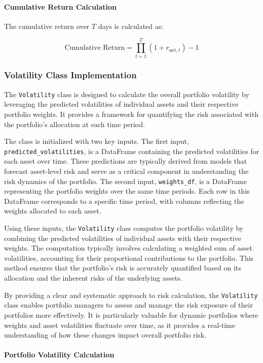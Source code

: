 \paragraph{Cumulative Return Calculation}

The cumulative return over \( T \) days is calculated as:

\[
\text{Cumulative Return} = \prod_{t=1}^T (1 + r_{\text{net}, t}) - 1
\]


\subsubsection{Volatility Class Implementation}

The \texttt{Volatility} class is designed to calculate the overall portfolio volatility by leveraging the predicted volatilities of individual assets and their respective portfolio weights. It provides a framework for quantifying the risk associated with the portfolio's allocation at each time period.

The class is initialized with two key inputs. The first input, \texttt{predicted\_volatilities}, is a DataFrame containing the predicted volatilities for each asset over time. These predictions are typically derived from models that forecast asset-level risk and serve as a critical component in understanding the risk dynamics of the portfolio. The second input, \texttt{weights\_df}, is a DataFrame representing the portfolio weights over the same time periods. Each row in this DataFrame corresponds to a specific time period, with columns reflecting the weights allocated to each asset.

Using these inputs, the \texttt{Volatility} class computes the portfolio volatility by combining the predicted volatilities of individual assets with their respective weights. The computation typically involves calculating a weighted sum of asset volatilities, accounting for their proportional contributions to the portfolio. This method ensures that the portfolio's risk is accurately quantified based on its allocation and the inherent risks of the underlying assets.

By providing a clear and systematic approach to risk calculation, the \texttt{Volatility} class enables portfolio managers to assess and manage the risk exposure of their portfolios more effectively. It is particularly valuable for dynamic portfolios where weights and asset volatilities fluctuate over time, as it provides a real-time understanding of how these changes impact overall portfolio risk.
\paragraph{Portfolio Volatility Calculation}

